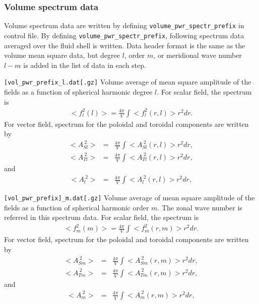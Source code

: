 \subsubsection{Volume spectrum data}
Volume spectrum data are written by defining {\tt volume\_pwr\_spectr\_prefix} in control file. By defining {\tt volume\_pwr\_spectr\_prefix}, following spectrum data averaged over the fluid shell is written. Data header format is the same as the volume mean square data, but degree $l$, order $m$, or meridional wave number $l-m$ is added in the list of data in each step. \\
%
\begin{description}
\item{\tt [vol\_pwr\_prefix\_l.dat[.gz]}  Volume average of mean square amplitude of the fields as a function of spherical harmonic degree $l$. For scalar field, the spectrum is
%
\begin{eqnarray}
<f_{l}^{2}(l)> =   \frac{4\pi}{V} \int <f_{l}^{2}(r,l)> r^{2} dr.
\end{eqnarray}
%
For vector field, spectrum for the poloidal and toroidal components are written by 
%
\begin{eqnarray}
<A_{Sl}^{\ 2} > & = &  \frac{4\pi}{V} \int <A_{Sl}^{\ 2}(r,l) >  r^{2} dr,
\nonumber \\
<A_{Tl}^{\ 2} > & = &  \frac{4\pi}{V} \int <A_{Tl}^{\ 2}(r,l) >  r^{2} dr,
\end{eqnarray}
and
\begin{eqnarray}
<A_{l}^{\ 2} > & = &  \frac{4\pi}{V} \int <A_{l}^{\ 2}(r,l) >  r^{2} dr,
\label{eq:vol_vec_msq_l}
\end{eqnarray}

\item{\tt [vol\_pwr\_prefix]\_m.dat[.gz]} Volume average of mean square amplitude of the fields as a function of spherical harmonic order $m$. The zonal wave number is referred in this spectrum data. For scalar field, the spectrum is
%
\begin{eqnarray}
<f_{m}^{2}(m)> =   \frac{4\pi}{V} \int <f_{m}^{2}(r,m)> r^{2} dr.
\end{eqnarray}
%
For vector field, spectrum for the poloidal and toroidal components are written by 
%
\begin{eqnarray}
<A_{Sm}^{\ 2} > & = &  \frac{4\pi}{V} \int <A_{Sm}^{\ 2}(r,m) >  r^{2} dr,
\nonumber \\
<A_{Tm}^{\ 2} > & = &  \frac{4\pi}{V} \int <A_{Tm}^{\ 2}(r,m) >  r^{2} dr,
\end{eqnarray}
and
\begin{eqnarray}
<A_{m}^{\ 2} > & = &  \frac{4\pi}{V} \int <A_{m}^{\ 2}(r,m) >  r^{2} dr,
\label{eq:vol_vec_msq_m}
\end{eqnarray}



\end{description}
